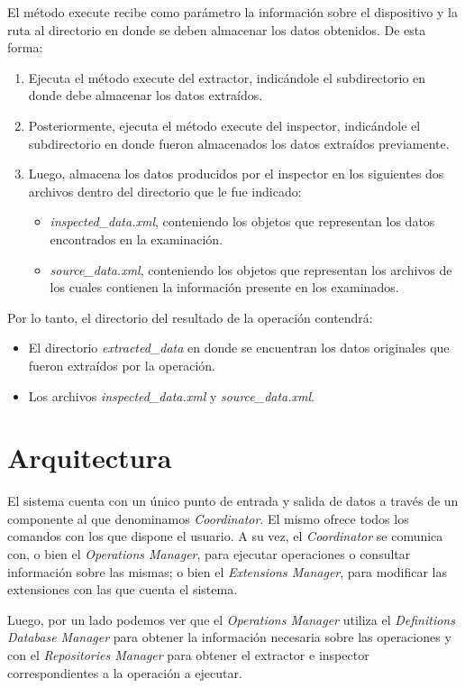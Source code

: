 El método execute recibe como parámetro la información sobre el dispositivo y la ruta al directorio en donde se deben almacenar los datos obtenidos. De esta forma:

\begin{enumerate}[topsep=0pt, parsep=0pt, partopsep=0pt]
\item Ejecuta el método execute del extractor, indicándole el subdirectorio en donde debe almacenar los datos extraídos.
\item Posteriormente, ejecuta el método execute del inspector, indicándole el subdirectorio en donde fueron almacenados los datos extraídos previamente.
\item Luego, almacena los datos producidos por el inspector en los siguientes dos archivos dentro del directorio que le fue indicado:
    \begin{itemize}
    \item \emph{inspected\_data.xml}, conteniendo los objetos que representan los datos encontrados en la examinación.
    \item \emph{source\_data.xml}, conteniendo los objetos que representan los archivos de los cuales contienen la información presente en los examinados.
    \end{itemize}
\end{enumerate}

Por lo tanto, el directorio del resultado de la operación contendrá:
\begin{itemize}
\item El directorio \emph{extracted\_data} en donde se encuentran los datos originales que fueron extraídos por la operación.
\item Los archivos \emph{inspected\_data.xml} y \emph{source\_data.xml}.
\end{itemize}

\section{Arquitectura} \label{arquitectura}
El sistema cuenta con un único punto de entrada y salida de datos a través de un componente al que denominamos \emph{Coordinator}. El mismo ofrece todos los comandos con los que dispone el usuario. A su vez, el \emph{Coordinator} se comunica con, o bien el \emph{Operations Manager}, para ejecutar operaciones o consultar información sobre las mismas; o bien el \emph{Extensions Manager}, para modificar las extensiones con las que cuenta el sistema.

Luego, por un lado podemos ver que el \emph{Operations Manager} utiliza el \emph{Definitions Database Manager} para obtener la información necesaria sobre las operaciones y con el \emph{Repositories Manager} para obtener el extractor e inspector correspondientes a la operación a ejecutar.

